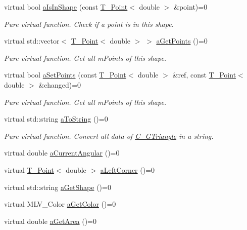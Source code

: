 \begin{DoxyCompactItemize}
virtual bool \hyperlink{classA__Shape_a63f825cbc9780208d9a137f5c14917d0}{a\+Is\+In\+Shape} (const \hyperlink{classT__Point}{T\+\_\+\+Point}$<$ double $>$ \&point)=0
\begin{DoxyCompactList}\small\item\em Pure virtual function. Check if a point is in this shape. \end{DoxyCompactList}\item 
virtual std\+::vector$<$ \hyperlink{classT__Point}{T\+\_\+\+Point}$<$ double $>$ $>$ \hyperlink{classA__Shape_a9fd1285bd63b1fc88943c9969bf01a5c}{a\+Get\+Points} ()=0
\begin{DoxyCompactList}\small\item\em Pure virtual function. Get all m\+Points of this shape. \end{DoxyCompactList}\item 
virtual bool \hyperlink{classA__Shape_a6996f454b337f8425ad13cba3f7a7c35}{a\+Set\+Points} (const \hyperlink{classT__Point}{T\+\_\+\+Point}$<$ double $>$ \&ref, const \hyperlink{classT__Point}{T\+\_\+\+Point}$<$ double $>$ \&changed)=0
\begin{DoxyCompactList}\small\item\em Pure virtual function. Get all m\+Points of this shape. \end{DoxyCompactList}\item 
virtual std\+::string \hyperlink{classA__Shape_ad8804b4e74543db374af6892367b7c2e}{a\+To\+String} ()=0
\begin{DoxyCompactList}\small\item\em Pure virtual function. Convert all data of \hyperlink{classC__GTriangle}{C\+\_\+\+G\+Triangle} in a string. \end{DoxyCompactList}\item 
virtual double \hyperlink{classA__Shape_a80fa4e009c875dd0ba7fc5bfeeb43f98}{a\+Current\+Angular} ()=0
\item 
virtual \hyperlink{classT__Point}{T\+\_\+\+Point}$<$ double $>$ \hyperlink{classA__Shape_abe6781b13037bf7ecea8ff9456b31533}{a\+Left\+Corner} ()=0
\item 
virtual std\+::string \hyperlink{classA__Shape_a1b202256a4e5dcb0edab4ab93a37122c}{a\+Get\+Shape} ()=0
\item 
virtual M\+L\+V\+\_\+\+Color \hyperlink{classA__Shape_a1e90c8132d33e4ac84d42f72606193b2}{a\+Get\+Color} ()=0
\item 
virtual double \hyperlink{classA__Shape_a1b142ee2d873d6c217f65de1632e7b6e}{a\+Get\+Area} ()=0
\end{DoxyCompactItemize}
